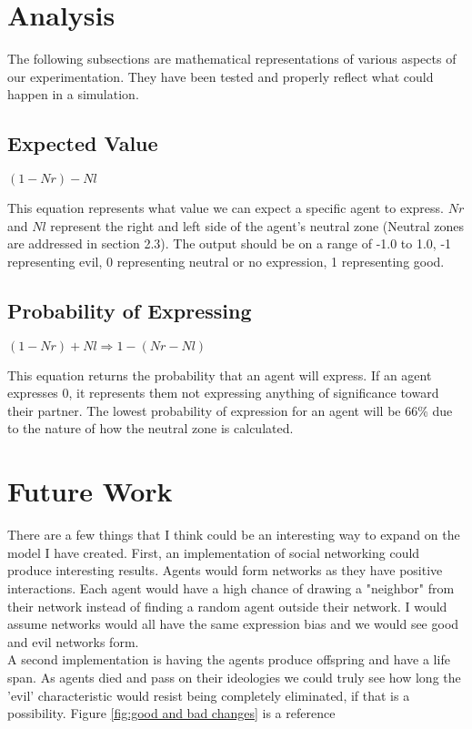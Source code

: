 \documentclass[]{article}
\begin{document}
\section{Analysis}
The following subsections are mathematical representations of various aspects of our experimentation. They have been tested and properly reflect what could happen in a simulation.
\subsection{Expected Value}
\begin{center}
	 $(1-Nr) - Nl$
\end{center}

This equation represents what value we can expect a specific agent to express. $Nr$ and $Nl$ represent the right and left side of the agent's neutral zone (Neutral zones are addressed in section 2.3). The output should be on a range of -1.0 to 1.0, -1 representing evil, 0 representing neutral or no expression, 1 representing good.
\subsection{Probability of Expressing}
\begin{center}
	$(1-Nr) + Nl \Rightarrow 1 - (Nr - Nl)$
\end{center}
This equation returns the probability that an agent will express. If an agent expresses 0, it represents them not expressing anything of significance toward their partner. The lowest probability of expression for an agent will be 66\% due to the nature of how the neutral zone is calculated. 




\section{Future Work}
There are a few things that I think could be an interesting way to expand on the model I have created. First, an implementation of social networking could produce interesting results. Agents would form networks as they have positive interactions. Each agent would have a high chance of drawing a "neighbor" from their network instead of finding a random agent outside their network. I would assume networks would all have the same expression bias and we would see good and evil networks form. \\
A second implementation is having the agents produce offspring and have a life span. As agents died and pass on their ideologies we could truly see how long the 'evil' characteristic would resist being completely eliminated, if that is a possibility.
Figure \ref{fig:good and bad changes} is a reference
\end{document}
